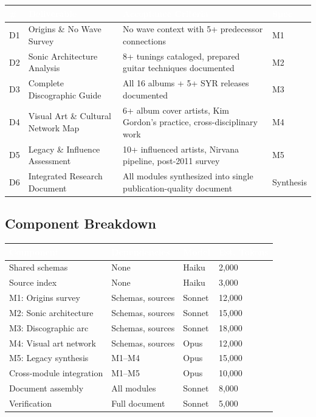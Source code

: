 \documentclass[11pt,letterpaper]{article}
\newcommand{\tableheader}[1]{\textbf{\sffamily\textcolor{white}{#1}}}
\begin{document}
\begin{center}
\begin{tabularx}{\textwidth}{C{0.8cm}L{3.5cm}XL{2cm}}
\toprule
{}
\tableheader{\#} & \tableheader{Deliverable} & \tableheader{Acceptance Criteria} & \tableheader{Spec} \\
\midrule
D1 & Origins \& No Wave Survey & No wave context with 5+ predecessor connections & M1 \\
D2 & Sonic Architecture Analysis & 8+ tunings cataloged, prepared guitar techniques documented & M2 \\
D3 & Complete Discographic Guide & All 16 albums + 5+ SYR releases documented & M3 \\
D4 & Visual Art \& Cultural Network Map & 6+ album cover artists, Kim Gordon's practice, cross-disciplinary work & M4 \\
D5 & Legacy \& Influence Assessment & 10+ influenced artists, Nirvana pipeline, post-2011 survey & M5 \\
D6 & Integrated Research Document & All modules synthesized into single publication-quality document & Synthesis \\
\bottomrule
\end{tabularx}
\end{center}

\subsection{Component Breakdown}

\begin{center}
\begin{tabularx}{\textwidth}{L{3cm}L{2.5cm}C{1.5cm}C{2cm}}
\toprule
{}
\tableheader{Component} & \tableheader{Dependencies} & \tableheader{Model} & \tableheader{Est. Tokens} \\
\midrule
Shared schemas & None & Haiku & 2,000 \\
Source index & None & Haiku & 3,000 \\
M1: Origins survey & Schemas, sources & Sonnet & 12,000 \\
M2: Sonic architecture & Schemas, sources & Sonnet & 15,000 \\
M3: Discographic arc & Schemas, sources & Sonnet & 18,000 \\
M4: Visual art network & Schemas, sources & Opus & 12,000 \\
M5: Legacy synthesis & M1--M4 & Opus & 15,000 \\
Cross-module integration & M1--M5 & Opus & 10,000 \\
Document assembly & All modules & Sonnet & 8,000 \\
Verification & Full document & Sonnet & 5,000 \\
\bottomrule
\end{tabularx}
\end{center}
\end{document}
